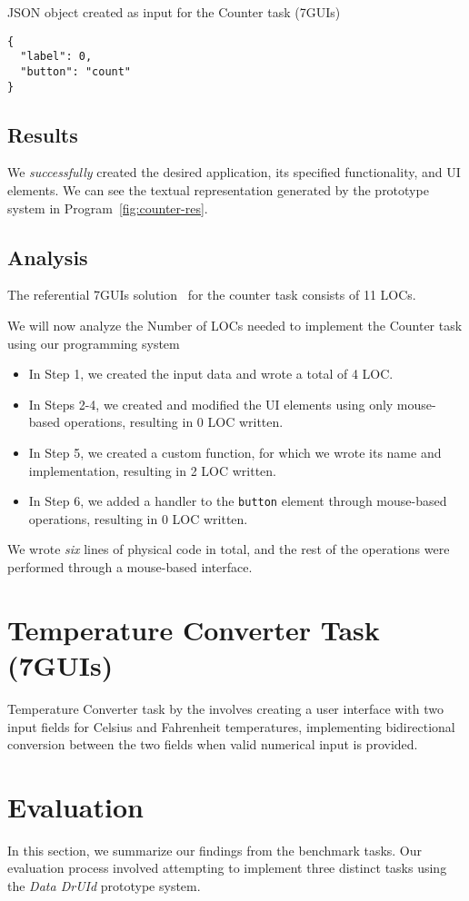 \begin{listing}[htbp]
	\caption{JSON object created as input for the Counter task (7GUIs)}
	\label{fig:counter-json}
	\begin{lstlisting}
{
  "label": 0,
  "button": "count"
}
    \end{lstlisting}
\end{listing}

\subsection{Results}
We \emph{successfully} created the desired application, its specified functionality, and UI elements.
We can see the textual representation generated by the prototype system in Program~\ref{fig:counter-res}.

\subsection{Analysis}
The referential 7GUIs solution~\cite{7guis-React-TypeScript-MobX/src/app/guis/counter.tsx} for the counter task consists of 11 LOCs.

We will now analyze the Number of LOCs needed to implement the Counter task using our programming system
\begin{itemize}
	\item In Step 1, we created the input data and wrote a total of 4 LOC.
	\item   In Steps 2-4, we created and modified the UI elements using only mouse-based operations, resulting in 0 LOC written.
	\item   In Step 5, we created a custom function, for which we wrote its name and implementation, resulting in 2 LOC written.
	\item   In Step 6, we added a handler to the \texttt{button} element through mouse-based operations, resulting in 0 LOC written.
\end{itemize}
We wrote \emph{six} lines of physical code in total, and the rest of the operations were performed through a mouse-based interface.




\section{Temperature Converter Task (7GUIs)}
Temperature Converter task by the \citet{7GUIs-web} involves creating a user interface with two input fields for Celsius and Fahrenheit temperatures,
implementing bidirectional conversion between the two fields when valid numerical input is provided.


\section{Evaluation}
In this section, we summarize our findings from the benchmark tasks.
Our evaluation process involved attempting to implement three distinct tasks using the \emph{Data DrUId} prototype system.


